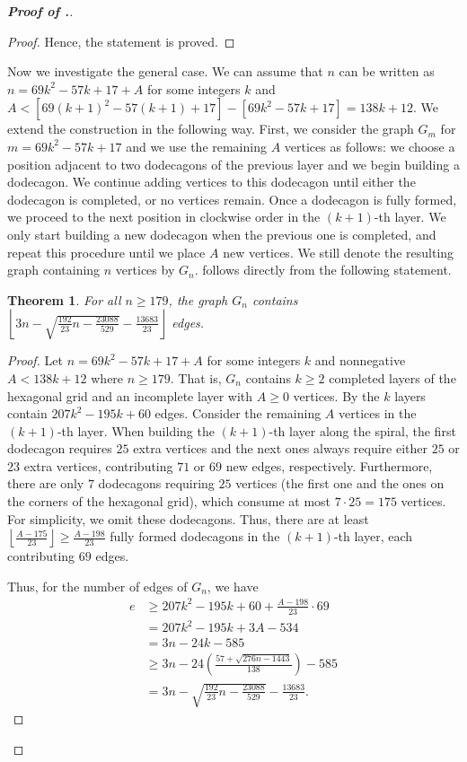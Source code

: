\documentclass[10pt]{article}
\newtheorem{theorem}{Theorem}
\theoremstyle{definition}
\begin{document}
\begin{proof}[\bf Proof of .]
\begin{proof}
    Hence, the statement is proved.
\end{proof}


Now we investigate the general case. We can assume that $n$ can be written as $n=69k^2-57k+17+A$ for some integers $k$ and $A<[69(k+1)^2-57(k+1)+17]-[69k^2-57k+17]=138k+12$. 
We extend the construction in the following way. First, we consider the graph $G_m$ for $m=69k^2-57k+17$ and we use the remaining $A$ vertices as follows: we choose a position adjacent to two dodecagons of the previous layer and we begin building a dodecagon. We continue adding vertices to this dodecagon until either the dodecagon is completed, or no vertices remain. Once a dodecagon is fully formed, we proceed to the next position in clockwise order in the $(k+1)$-th layer. We only start building a new dodecagon when the previous one is completed, and repeat this procedure until we place $A$ new vertices.
We still denote the resulting graph containing $n$ vertices by $G_n$.  follows directly from the following statement.
\begin{theorem}
For all $n \geq 179$, the graph $G_n$ contains
$\left\lfloor3n-\sqrt{\frac{192}{23}n-\frac{23088}{529}}-\frac{13683}{23}\right\rfloor$ edges.
\end{theorem}

\begin{proof}
Let $n=69k^2-57k+17+A$ for some integers $k$ and nonnegative $A<138k+12$ where $n \geq 179$. That is, $G_n$ contains $k \geq 2$ completed layers of the hexagonal grid and an incomplete layer with $A \geq 0$ vertices. By  the $k$ layers contain $207k^2-195k+60$ edges. Consider the remaining $A$ vertices in the $(k+1)$-th layer. When building the $(k+1)$-th layer along the spiral, the first dodecagon requires $25$ extra vertices and the next ones always require either $25$ or $23$ extra vertices, contributing $71$ or $69$ new edges, respectively.
Furthermore, there are only $7$ dodecagons requiring $25$ vertices (the first one and the ones on the corners of the hexagonal grid), which consume at most $7 \cdot 25 = 175$ vertices. For simplicity, we omit these dodecagons. Thus, there are at least $\left\lfloor\frac{A-175}{23}\right\rfloor\geq \frac{A-198}{23}$ fully formed dodecagons in the $(k+1)$-th layer, each contributing $69$ edges.

Thus, for the number of edges of $G_n$, we have
\begin{align}
e&\geq 207k^2-195k+60+\frac{A-198}{23}\cdot69  \nonumber\\
&=207k^2-195k+3A-534 \nonumber\\
&= 3n-24k-585 \label{eq9} \\
&\geq 3n - 24 \left( \frac{57 + \sqrt{276n - 1443}}{138} \right) - 585 \label{eq10}\\
&= 3n - \sqrt{\frac{192}{23}n - \frac{23088}{529}} - \frac{13683}{23}. \nonumber
\end{align}


\end{proof}
\end{proof}
\end{document}
